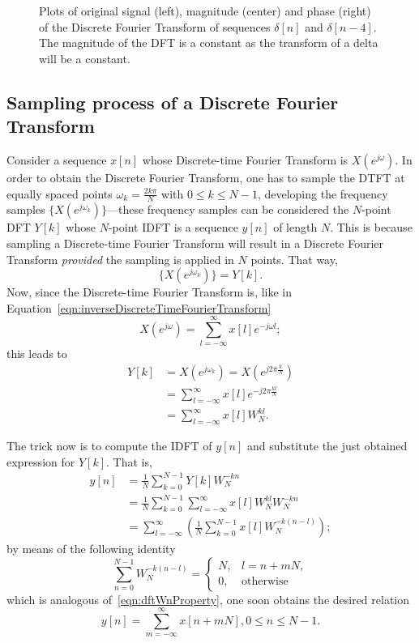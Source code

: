 \documentclass[\documentfontsize, twocolumn]{\classname}
\begin{document}
\begin{figure*}[ht]
\begin{center}
\scalebox{0.6}{

}\caption{Plots of original signal (left), magnitude (center) and phase (right) of the Discrete Fourier Transform of sequences $\delta[n]$ and $\delta[n-4]$. The magnitude of the DFT is a constant as the transform of a delta will be a constant.}\label{oct:dftImpulse}
\end{center}
\end{figure*}

\subsection{Sampling process of a Discrete Fourier Transform}

Consider a sequence $x[n]$ whose Discrete-time Fourier Transform is $X(e^{j\omega})$. In order to obtain the Discrete Fourier Transform, one has to sample the DTFT at equally spaced points $\omega_k = \frac{2k\pi}{N}$ with $0 \leq k \leq N-1$, developing the frequency samples $\{X(e^{j\omega_k})\}$---these frequency samples can be considered the $N$-point DFT $Y[k]$ whose $N$-point IDFT is a sequence $y[n]$ of length $N$. This is because sampling a Discrete-time Fourier Transform will result in a Discrete Fourier Transform \emph{provided} the sampling is applied in $N$ points. That way, \[\{X(e^{j\omega_k})\} = Y[k].\]
Now, since the Discrete-time Fourier Transform is, like in Equation~\ref{eqn:inverseDiscreteTimeFourierTransform}
\[
    X(e^{j\omega}) = \sum_{l=-\infty}^\infty x[l] e^{-j\omega l};
\]
this leads to
\begin{align*}
    Y[k]
    &=  X(e^{j\omega_k}) = X\left(e^{j2\pi \frac k N}\right)\\
    &= \sum_{l=-\infty}^\infty x[l] e^{-j2\pi \frac{kl}{N}}\\
    &= \sum_{l=-\infty}^\infty x[l]W_N^{kl}.
\end{align*}

The trick now is to compute the IDFT of $y[n]$ and substitute the just obtained expression for $Y[k]$. That is,
\begin{align*}
    y[n]
    &= \frac 1 N \sum_{k=0}^{N-1} Y[k] W_N^{-kn}\\
    &= \frac 1 N \sum_{k=0}^{N-1}\sum_{l=-\infty}^\infty x[l]W_N^{kl} W_N^{-kn}\\
    &= \sum_{l=-\infty}^\infty\left(\frac 1 N \sum_{k=0}^{N-1} x[l]W_N^{-k(n-l)}\right);
\end{align*}
by means of the following identity
\begin{equation}\label{eqn:dftWnPropertyTwo}
    \sum_{n=0}^{N-1}W_N^{-k(n-l)} = \left\{\begin{array}{ll} N, & l = n + mN, \\ 0, & \mbox{otherwise}\end{array}\right.
\end{equation}
which is analogous of~\ref{eqn:dftWnProperty}, one soon obtains the desired relation
\begin{equation}\label{eqn:dftInfiniteReplicas}
    y[n] = \sum_{m=-\infty}^{\infty} x[n + mN], 0 \leq n \leq N-1.
\end{equation}
\end{document}
